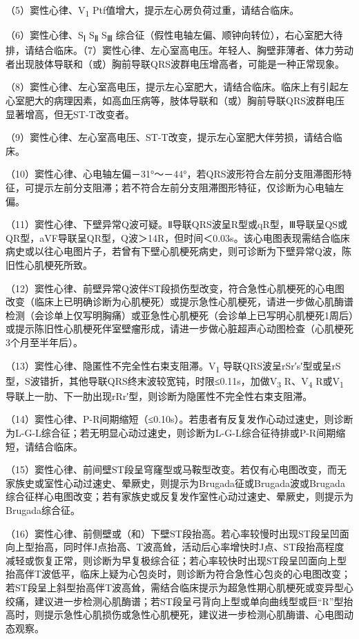 （5）窦性心律、V\textsubscript{1}
Ptf值增大，提示左心房负荷过重，请结合临床。

（6）窦性心律、S\textsubscript{Ⅰ} S\textsubscript{Ⅱ} S\textsubscript{Ⅲ}
综合征（假性电轴左偏、顺钟向转位），右心室肥大待排，请结合临床。（7）窦性心律、左心室高电压。年轻人、胸壁菲薄者、体力劳动者出现肢体导联和（或）胸前导联QRS波群电压增高者，可能是一种正常现象。

（8）窦性心律、左心室高电压，提示左心室肥大，请结合临床。临床上有引起左心室肥大的病理因素，如高血压病等，肢体导联和（或）胸前导联QRS波群电压显著增高，但无ST-T改变者。

（9）窦性心律、左心室高电压、ST-T改变，提示左心室肥大伴劳损，请结合临床。

（10）窦性心律、心电轴左偏－31°～－44°，若QRS波形符合左前分支阻滞图形特征，可提示左前分支阻滞；若不符合左前分支阻滞图形特征，仅诊断为心电轴左偏。

（11）窦性心律、下壁异常Q波可疑。Ⅱ导联QRS波呈R型或qR型，Ⅲ导联呈QS或QR型，aVF导联呈QR型，Q波＞14R，但时间＜0.03s。该心电图表现需结合临床病史或以往心电图片子，若曾有下壁心肌梗死病史，则可诊断为下壁异常Q波，陈旧性心肌梗死所致。

（12）窦性心律、前壁异常Q波伴ST段损伤型改变，符合急性心肌梗死的心电图改变（临床上已明确诊断为心肌梗死）或提示急性心肌梗死，请进一步做心肌酶谱检测（会诊单上仅写明胸痛）或亚急性心肌梗死（会诊单上已写明心肌梗死1周后）或提示陈旧性心肌梗死伴室壁瘤形成，请进一步做心脏超声心动图检查（心肌梗死3个月至半年后）。

（13）窦性心律、隐匿性不完全性右束支阻滞。V\textsubscript{1}
导联QRS波呈rSr′s′型或呈rS型，S波错折，其他导联QRS终末波较宽钝，时限≤0.11s，加做V\textsubscript{3}
R、V\textsubscript{4} R或V\textsubscript{1}
导联上一肋、下一肋出现rRr′型，则诊断为隐匿性不完全性右束支阻滞。

（14）窦性心律、P-R间期缩短（≤0.10s）。若患者有反复发作心动过速史，则诊断为L-G-L综合征；若无明显心动过速史，则诊断为L-G-L综合征待排或P-R间期缩短，请结合临床。

（15）窦性心律、前间壁ST段呈穹窿型或马鞍型改变。若仅有心电图改变，而无家族史或室性心动过速史、晕厥史，则提示为Brugada征或Brugada波或Brugada综合征样心电图改变；若有家族史或反复发作室性心动过速史、晕厥史，则提示为Brugada综合征。

（16）窦性心律、前侧壁或（和）下壁ST段抬高。若心率较慢时出现ST段呈凹面向上型抬高，同时伴J点抬高、T波高耸，活动后心率增快时J点、ST段抬高程度减轻或恢复正常，则诊断为早复极综合征；若心率较快时出现ST段呈凹面向上型抬高伴T波低平，临床上疑为心包炎时，则诊断为符合急性心包炎的心电图改变；若ST段呈上斜型抬高伴T波高耸，需结合临床提示为超急性期心肌梗死或变异型心绞痛，建议进一步检测心肌酶谱；若ST段呈弓背向上型或单向曲线型或巨“R”型抬高时，则提示急性心肌损伤或急性心肌梗死，建议进一步检测心肌酶谱、心电图动态观察。

